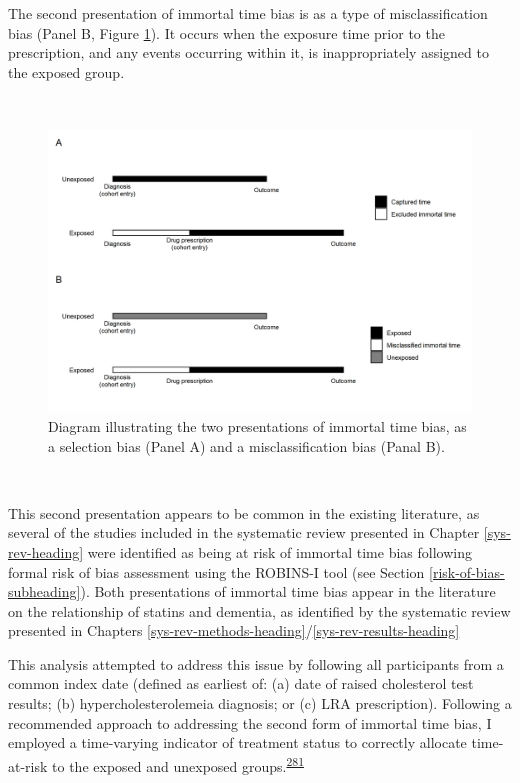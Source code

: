 \documentclass[a4paper, twoside]{templates/ociamthesis}
\begin{document}
The second presentation of immortal time bias is as a type of misclassification bias (Panel B, Figure \ref{fig:immortalTimeBias}). It occurs when the exposure time prior to the prescription, and any events occurring within it, is inappropriately assigned to the exposed group.

~





\begin{figure}[H]
\includegraphics[width=1\linewidth]{figures/cprd-analysis/immortal_time} \caption[shortcap]{Diagram illustrating the two presentations of immortal time bias, as a selection bias (Panel A) and a misclassification bias (Panal B).}\label{fig:immortalTimeBias}
\end{figure}

~

This second presentation appears to be common in the existing literature, as several of the studies included in the systematic review presented in Chapter \ref{sys-rev-heading} were identified as being at risk of immortal time bias following formal risk of bias assessment using the ROBINS-I tool (see Section \ref{risk-of-bias-subheading}). Both presentations of immortal time bias appear in the literature on the relationship of statins and dementia, as identified by the systematic review presented in Chapters \ref{sys-rev-methods-heading}/\ref{sys-rev-results-heading}

This analysis attempted to address this issue by following all participants from a common index date (defined as earliest of: (a) date of raised cholesterol test results; (b) hypercholesterolemeia diagnosis; or (c) LRA prescription). Following a recommended approach to addressing the second form of immortal time bias, I employed a time-varying indicator of treatment status to correctly allocate time-at-risk to the exposed and unexposed groups.\textsuperscript{\protect\hyperlink{ref-levesque2010}{281}}
\end{document}
